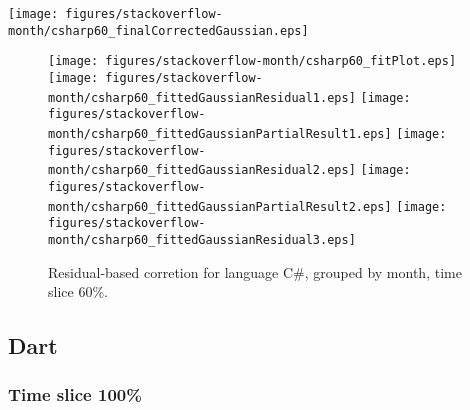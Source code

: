 \begin{center}
{\texttt{[image: figures/stackoverflow-month/csharp60\_finalCorrectedGaussian.eps]}}
\end{center}

\FloatBarrier

\begin{figure}[t]
\centering
{}
{\texttt{[image: figures/stackoverflow-month/csharp60\_fitPlot.eps]}}
{\texttt{[image: figures/stackoverflow-month/csharp60\_fittedGaussianResidual1.eps]}}
{\texttt{[image: figures/stackoverflow-month/csharp60\_fittedGaussianPartialResult1.eps]}}
{\texttt{[image: figures/stackoverflow-month/csharp60\_fittedGaussianResidual2.eps]}}
{\texttt{[image: figures/stackoverflow-month/csharp60\_fittedGaussianPartialResult2.eps]}}
{\texttt{[image: figures/stackoverflow-month/csharp60\_fittedGaussianResidual3.eps]}}
\caption{Residual-based corretion for language C\#, grouped by month, time slice 60\%.}
\end{figure}


\FloatBarrier


\subsection{Dart}

\subsubsection{Time slice 100\%}

